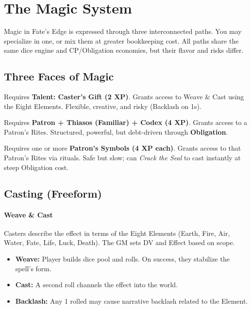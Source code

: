 

\section{The Magic System}

Magic in Fate's Edge is expressed through three interconnected paths. 
You may specialize in one, or mix them at greater bookkeeping cost. 
All paths share the same dice engine and CP/Obligation economies, but their flavor and risks differ.

\subsection{Three Faces of Magic}
\begin{description}[leftmargin=1.5em, style=nextline]
  \item[Caster (Freeform):] Requires \textbf{Talent: Caster’s Gift (2 XP)}. Grants access to Weave \& Cast using the Eight Elements. Flexible, creative, and risky (Backlash on 1s). 
  \item[Rites User (Warlock):] Requires \textbf{Patron + Thiasos (Familiar) + Codex (4 XP)}. Grants access to a Patron’s Rites. Structured, powerful, but debt-driven through \textbf{Obligation}.
  \item[Invoker (Symbol Path):] Requires one or more \textbf{Patron’s Symbols (4 XP each)}. Grants access to that Patron’s Rites via rituals. Safe but slow; can \emph{Crack the Seal} to cast instantly at steep Obligation cost.
\end{description}

\subsection{Casting (Freeform)}
\paragraph{Weave \& Cast}
Casters describe the effect in terms of the Eight Elements (Earth, Fire, Air, Water, Fate, Life, Luck, Death). The GM sets DV and Effect based on scope. 

\begin{itemize}
  \item \textbf{Weave:} Player builds dice pool and rolls. On success, they stabilize the spell’s form.
  \item \textbf{Cast:} A second roll channels the effect into the world. 
  \item \textbf{Backlash:} Any 1 rolled may cause narrative backlash related to the Element.
\end{itemize}

